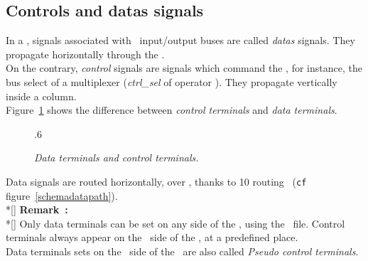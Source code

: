    \subsection{Controls and datas signals}
   \label{refctrldataterm}
   \forceindent
     In a \datapath, signals associated with \operator\ input/output buses
   are called {\it datas} signals. They propagate horizontally through the
   \datapath.\\
   \indent
     On the contrary, {\it control} signals are signals which command the
   \operators, for instance, the bus select of a multiplexer ({\it ctrl\_sel}
   of operator \DPMUXIICS). They propagate vertically inside a column.\\
   \indent
     Figure~\ref{ctrldata} shows the difference between {\it control terminals}
   and {\it data terminals}.
   \begin{figure}[H]
     \begin{center}
       \leavevmode\epsfxsize.6\textwidth{}
     \end{center}
     \caption{
       \label{ctrldata}
       {\it Data terminals and control terminals.}}
   \end{figure}
   \indent
     Data signals are routed horizontally, over \slices, thanks to 10
   routing \tracks\ ({\tt cf} figure~\ref{schemadatapath}).
   \\*[\bigskipamount]
   {\bf Remark~:}\\*[\bigskipamount]
   \indent
     Only data terminals can be set on any side of the \datapath, using the
   \dprfile\ file. Control terminals always appear on the \NORTH\ side of
   the \datapath, at a predefined place.\\
   \forceindent
     Data terminals sets on the \NORTH\ side of the \datapath\ are also called
   {\it Pseudo control terminals}.
